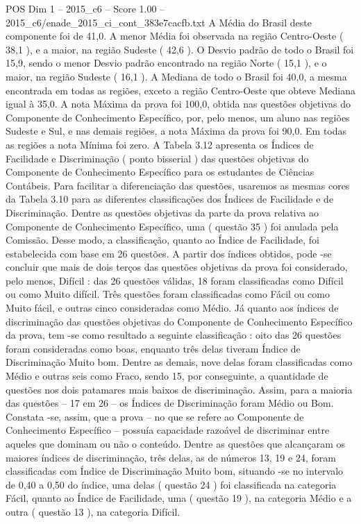 \begin{textsample}{POS Dim 1 – 2015\_c6 – Score 1.00 – 2015\_c6/enade\_2015\_ci\_cont\_383e7cacfb.txt}
A Média do Brasil deste componente foi de 41,0.
A menor Média foi observada na região Centro-Oeste ( 38,1 ), e a maior, na região Sudeste ( 42,6 ).
O Desvio padrão de todo o Brasil foi 15,9, sendo o menor Desvio padrão encontrado na região Norte ( 15,1 ), e o maior, na região Sudeste ( 16,1 ).
A Mediana de todo o Brasil foi 40,0, a mesma encontrada em todas as regiões, exceto a região Centro-Oeste que obteve Mediana igual à 35,0.
A nota Máxima da prova foi 100,0, obtida nas questões objetivas do Componente de Conhecimento Específico, por, pelo menos, um aluno nas regiões Sudeste e Sul, e nas demais regiões, a nota Máxima da prova foi 90,0.
Em todas as regiões a nota Mínima foi zero.
A Tabela 3.12 apresenta os Índices de Facilidade e Discriminação ( ponto bisserial ) das questões objetivas do Componente de Conhecimento Específico para os estudantes de Ciências Contábeis.
Para facilitar a diferenciação das questões, usaremos as mesmas cores da Tabela 3.10 para as diferentes classificações dos Índices de Facilidade e de Discriminação.
Dentre as questões objetivas da parte da prova relativa ao Componente de Conhecimento Específico, uma ( questão 35 ) foi anulada pela Comissão.
Desse modo, a classificação, quanto ao Índice de Facilidade, foi estabelecida com base em 26 questões.
A partir dos índices obtidos, pode -se concluir que mais de dois terços das questões objetivas da prova foi considerado, pelo menos, Difícil : das 26 questões válidas, 18 foram classificadas como Difícil ou como Muito difícil.
Três questões foram classificadas como Fácil ou como Muito fácil, e outras cinco consideradas como Médio.
Já quanto aos índices de discriminação das questões objetivas do Componente de Conhecimento Específico da prova, tem -se como resultado a seguinte classificação : oito das 26 questões foram consideradas como boas, enquanto três delas tiveram Índice de Discriminação Muito bom.
Dentre as demais, nove delas foram classificadas como Médio e outras seis como Fraco, sendo 15, por conseguinte, a quantidade de questões nos dois patamares mais baixos de discriminação.
Assim, para a maioria das questões – 17 em 26 – os Índices de Discriminação foram Médio ou Bom.
Constata -se, assim, que a prova – no que se refere ao Componente de Conhecimento Específico – possuía capacidade razoável de discriminar entre aqueles que dominam ou não o conteúdo.
Dentre as questões que alcançaram os maiores índices de discriminação, três delas, as de números 13, 19 e 24, foram classificadas com Índice de Discriminação Muito bom, situando -se no intervalo de 0,40 a 0,50 do índice, uma delas ( questão 24 ) foi classificada na categoria Fácil, quanto ao Índice de Facilidade, uma ( questão 19 ), na categoria Médio e a outra ( questão 13 ), na categoria Difícil.

\end{textsample}
